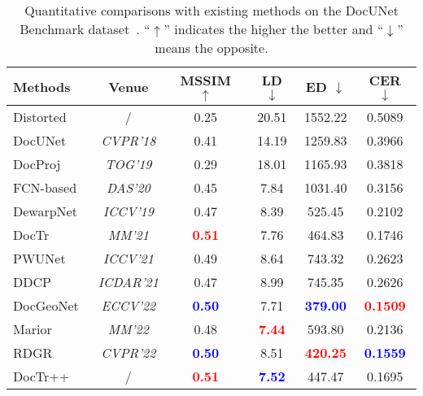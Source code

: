 \documentclass[lettersize,journal]{IEEEtran}
\begin{document}
\setlength{\tabcolsep}{1.6mm}
\begin{table}[t]
\centering
	\caption{Quantitative comparisons with existing methods on the DocUNet Benchmark dataset~\cite{8578592}. ``$\uparrow$'' indicates the higher the better and ``$\downarrow$'' means the opposite.}
\begin{tabular}{l|c|cccc} 
   \toprule
   \textbf{Methods} & \textbf{Venue} &\textbf{MSSIM} $\uparrow$ &\textbf{LD} $\downarrow$  &\textbf{ED} $\downarrow$ &\textbf{CER} $\downarrow$   \\ 
   \midrule
    Distorted & / & 0.25 & 20.51 & 1552.22 & 0.5089 \\
            \midrule
    DocUNet~\cite{8578592} & \emph{CVPR'18} & 0.41 & 14.19 & 1259.83 & 0.3966 \\
    DocProj~\cite{li2019document} & \emph{TOG'19} & 0.29 & 18.01  & 1165.93 & 0.3818 \\

    FCN-based~\cite{xie2020dewarping} & \emph{DAS'20}  & 0.45 & 7.84 & 1031.40 & 0.3156 \\ 

    DewarpNet~\cite{9010747} & \emph{ICCV'19}  & 0.47 & 8.39  & 525.45 & 0.2102 \\

    DocTr~\cite{feng2021doctr} & \emph{MM'21} & \textcolor{red}{\textbf{0.51}} & 7.76  & 464.83 & 0.1746 \\
    
    PWUNet~\cite{das2021end} & \emph{ICCV'21} & 0.49 & 8.64  & 743.32 & 0.2623 \\    
    
    DDCP~\cite{xie2021document}  & \emph{ICDAR'21} & 0.47 & 8.99 & 745.35 & 0.2626 \\

    DocGeoNet~\cite{feng2022geometric} & \emph{ECCV'22} & \textcolor{blue}{\textbf{0.50}} & 7.71 & \textcolor{blue}{\textbf{379.00}} & \textcolor{red}{\textbf{0.1509}} \\ 

    Marior~\cite{zhang2022marior} & \emph{MM'22} & 0.48 & \textcolor{red}{\textbf{7.44}} & 593.80 & 0.2136 \\

    RDGR~\cite{jiang2022revisiting} & \emph{CVPR'22} & \textcolor{blue}{\textbf{0.50}} & 8.51 & \textcolor{red}{\textbf{420.25}} & \textcolor{blue}{\textbf{0.1559}}  \\
        \midrule
        DocTr++ & / & \textcolor{red}{\textbf{0.51}}  & \textcolor{blue}{\textbf{7.52}} & 447.47 & 0.1695  \\
   \bottomrule
\end{tabular}
\label{tab:t1}
\end{table} 
\end{document}

